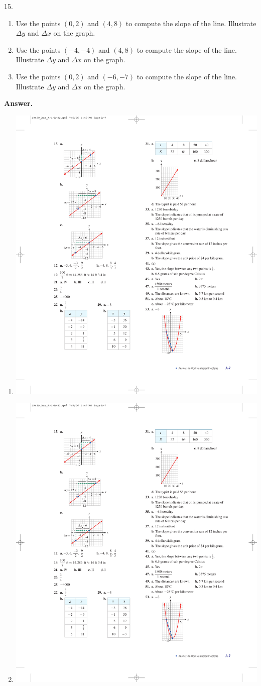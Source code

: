 \documentclass[10pt,]{book}
\theoremstyle{plain}
\theoremstyle{definition}
\theoremstyle{definition}
\theoremstyle{definition}
\theoremstyle{definition}
\numberwithin{equation}{part}
\begin{document}
\begin{exerciselist}
\item[15.]\hypertarget{exercise-230}{}\leavevmode%
\begin{enumerate}[label=*\alph**]
\item\hypertarget{li-941}{}Use the points \((0, 2)\) and \((4, 8)\) to compute the slope of the line. Illustrate \(\Delta y\) and \(\Delta x\) on the graph.%
\item\hypertarget{li-942}{}Use the points \((-4, -4)\) and \((4, 8)\) to compute the slope of the line. Illustrate \(\Delta y\) and \(\Delta x\) on the graph.%
\item\hypertarget{li-943}{}Use the points \((0, 2)\) and \((-6, -7)\) to compute the slope of the line. Illustrate \(\Delta y\) and \(\Delta x\) on the graph.%
\end{enumerate}
%
\par\smallskip
\par\smallskip
\noindent\textbf{Answer.}\hypertarget{answer-133}{}\quad
\leavevmode%
\begin{enumerate}[label=*\alph**]
\item\hypertarget{li-944}{}\includegraphics[width=0.4\linewidth]{images/fig-ans-1-4-15}
%
\item\hypertarget{li-945}{}\includegraphics[width=0.4\linewidth]{images/fig-ans-1-4-15b}

\end{enumerate}
\end{exerciselist}
\end{document}
